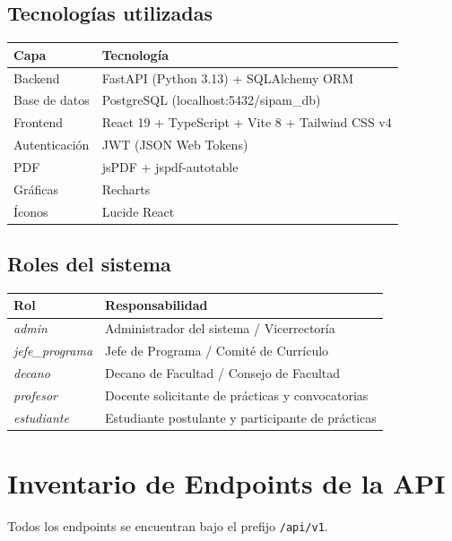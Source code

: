 \documentclass[12pt,a4paper]{article}
\newcommand{\endpoint}[1]{\texttt{\color{grisusco}#1}}
\newcommand{\role}[1]{\textit{\color{vinotinto}#1}}
\begin{document}
\subsection*{Tecnologías utilizadas}
\begin{tabular}{ll}
  \toprule
  \textbf{Capa} & \textbf{Tecnología} \\
  \midrule
  Backend        & FastAPI (Python 3.13) + SQLAlchemy ORM \\
  Base de datos  & PostgreSQL (localhost:5432/sipam\_db) \\
  Frontend       & React 19 + TypeScript + Vite 8 + Tailwind CSS v4 \\
  Autenticación  & JWT (JSON Web Tokens) \\
  PDF            & jsPDF + jspdf-autotable \\
  Gráficas       & Recharts \\
  Íconos         & Lucide React \\
  \bottomrule
\end{tabular}

\subsection*{Roles del sistema}
\begin{tabular}{ll}
  \toprule
  \textbf{Rol} & \textbf{Responsabilidad} \\
  \midrule
  \role{admin}         & Administrador del sistema / Vicerrectoría \\
  \role{jefe\_programa} & Jefe de Programa / Comité de Currículo \\
  \role{decano}        & Decano de Facultad / Consejo de Facultad \\
  \role{profesor}      & Docente solicitante de prácticas y convocatorias \\
  \role{estudiante}    & Estudiante postulante y participante de prácticas \\
  \bottomrule
\end{tabular}

\newpage
\section{Inventario de Endpoints de la API}

Todos los endpoints se encuentran bajo el prefijo \endpoint{/api/v1}.
\end{document}
